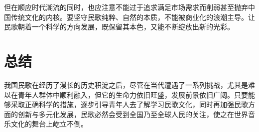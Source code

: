 \documentclass[UTF8,a4paper]{ctexart}
\begin{document}
\begin{multicols}{2}
		    \indent 但在顺应时代潮流的同时，也应注意不能过于追求满足市场需求而削弱甚至抛弃中国传统文化的内核。要坚守民歌纯粹、自然的本质，不能被商业化的浪潮主导。让民歌朝着一个科学的方向发展，既保留其本色，又能不断绽放出新的光彩。
		
		
		\section{总结}
	    \indent 我国民歌在经历了漫长的历史积淀之后，尽管在当代遭遇了一系列挑战，尤其是难以在青年人群体中顺利融入，但它的生命力依旧旺盛，发展前景依旧广阔。只要能够采取正确科学的措施，逐步引导青年人去了解学习民歌文化，同时再加强民歌方面的创新与多元化发展，民歌必然会受到全国乃至全球人民的关注，使之在世界音乐文化的舞台上屹立不倒。
	
	


\end{multicols}

 \quad \\

\begin{multicols}{1}

\end{multicols}
\end{document}
